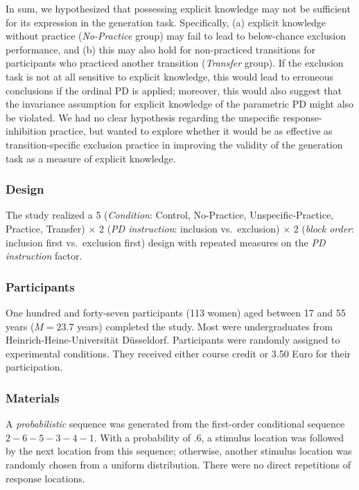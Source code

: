 \documentclass[jou]{apa6}
\theoremstyle{definition}
\theoremstyle{definition}
\theoremstyle{definition}
\theoremstyle{remark}
\begin{document}
In sum, we hypothesized that possessing explicit knowledge may not be
sufficient for its expression in the generation task. Specifically, (a)
explicit knowledge without practice (\emph{No-Practice} group) may fail
to lead to below-chance exclusion performance, and (b) this may also
hold for non-practiced transitions for participants who practiced
another transition (\emph{Transfer} group). If the exclusion task is not
at all sensitive to explicit knowledge, this would lead to erroneous
conclusions if the ordinal PD is applied; moreover, this would also
suggest that the invariance assumption for explicit knowledge of the
parametric PD might also be violated. We had no clear hypothesis
regarding the unspecific response-inhibition practice, but wanted to
explore whether it would be as effective as transition-specific
exclusion practice in improving the validity of the generation task as a
measure of explicit knowledge.

\subsubsection{Design}\label{design}

The study realized a 5 (\emph{Condition}: Control, No-Practice,
Unspecific-Practice, Practice, Transfer) \(\times\) 2 (\emph{PD
instruction}: inclusion vs.~exclusion) \(\times\) 2 (\emph{block order}:
inclusion first vs.~exclusion first) design with repeated measures on
the \emph{PD instruction} factor.

\subsubsection{Participants}\label{participants}

One hundred and forty-seven participants (113 women) aged between 17 and
55 years (\(M = 23.7\) years) completed the study. Most were
undergraduates from Heinrich-Heine-Universität Düsseldorf. Participants
were randomly assigned to experimental conditions. They received either
course credit or 3.50 Euro for their participation.

\subsubsection{Materials}\label{materials}

A \emph{probabilistic} sequence was generated from the first-order
conditional sequence \(2-6-5-3-4-1\). With a probability of \(.6\), a
stimulus location was followed by the next location from this sequence;
otherwise, another stimulus location was randomly chosen from a uniform
distribution. There were no direct repetitions of response locations.
\end{document}
